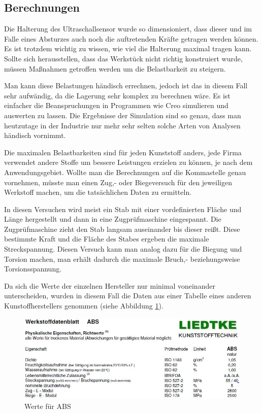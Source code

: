 			\newpage

	\subsection{Berechnungen}

	Die Halterung des Ultraschallsensor wurde so dimensioniert, dass dieser und im Falle eines Absturzes auch noch die auftretenden Kräfte getragen werden können.
	Es ist trotzdem wichtig zu wissen, wie viel die Halterung maximal tragen kann.
	Sollte sich herausstellen, dass das Werkstück nicht richtig konstruiert wurde, müssen Maßnahmen getroffen werden um die Belastbarkeit zu steigern.

	Man kann diese Belastungen händisch errechnen, jedoch ist das in diesem Fall sehr aufwändig, da die Lagerung sehr komplex zu berechnen wäre.
	Es ist einfacher die Beanspruchungen in Programmen wie Creo simulieren und auswerten zu lassen.
	Die Ergebnisse der Simulation sind so genau, dass man heutzutage in der Industrie nur mehr sehr selten solche Arten von Analysen händisch vornimmt.

	Die maximalen Belastbarkeiten sind für jeden Kunststoff anders, jede Firma verwendet andere Stoffe um bessere Leistungen erzielen zu können, je nach dem Anwendungsgebiet.
	Wollte man die Berechnungen auf die Kommastelle genau vornehmen, müsste man einen Zug,- oder Biegeversuch für den jeweiligen Werkstoff machen,
	um die tatsächlichen Daten zu ermitteln.

	In diesen Versuchen wird meist ein Stab mit einer vordefinierten Fläche und Länge hergestellt und dann in eine Zugprüfmaschine eingespannt.
	Die Zugprüfmaschine zieht den Stab langsam auseinander bis dieser reißt. Diese bestimmte Kraft und die Fläche des Stabes ergeben die maximale Streckspannung.
	Diesen Versuch kann man analog dazu für die Biegung und Torsion machen, man erhält dadurch die maximale Bruch,- beziehungsweise Torsionsspannung.

	Da sich die Werte der einzelnen Hersteller nur minimal voneinander unterscheiden,
	wurden in diesem Fall die Daten aus einer Tabelle eines anderen Kunstoffherstellers genommen (siehe Abbildung \ref{werte_abs}).

			\begin{figure}[H]
			\begin{centering}
			\includegraphics[width = 1\textwidth]{Bilder/werte_abs}
			\par\end{centering}
			\caption[Werte ABS]{Werte für ABS\cite{werte_abs}}
			\label{werte_abs}
			\end{figure}

